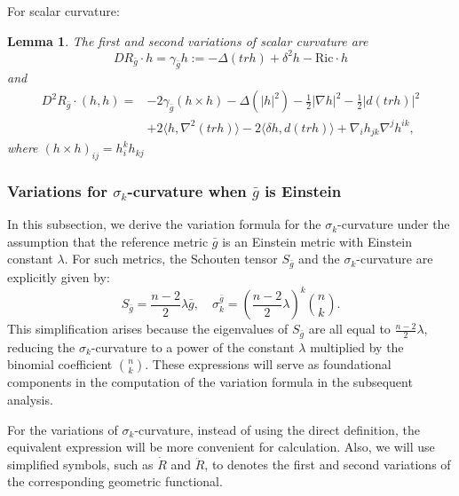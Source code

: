 \documentclass[12pt]{amsart}
\newtheorem{lemma}{Lemma}[section]
\newcommand{\bg}{\bar{g}}
\numberwithin{equation}{section}
\begin{document}
For scalar curvature:
\begin{lemma}\label{Lemma: variation_of_scalar}
    The first and second variations of scalar curvature are
    \begin{equation*}
        DR_{\bg}\cdot h=\gamma_{\bg} h:=-\Delta(trh)+\delta^2h-\mathrm{Ric}\cdot h
    \end{equation*}
    and
    \begin{equation*}
       \begin{split}
        D^2R_{\bg}\cdot(h,h)=&-2\gamma_{\bg}(h\times h)-\Delta(|h|^2)-\frac{1}{2}|\nabla h|^2-\frac{1}{2}|d(trh)|^2\\
        &+2\langle h,\nabla^2(trh)\rangle-2\langle\delta h,d(trh)\rangle+\nabla_{i}h_{jk}\nabla^jh^{ik},
       \end{split}
    \end{equation*}
    where $(h\times h)_{ij}=h_i^kh_{kj}$
\end{lemma}

\subsubsection{Variations for $\sigma_k$-curvature when $\bg$ is Einstein}

In this subsection, we derive the variation formula for the $\sigma_k$-curvature under the assumption that the reference metric $\bg$ is an Einstein metric with Einstein constant $\lambda$. For such metrics, the Schouten tensor $S_{\bg}$ and the $\sigma_k$-curvature are explicitly given by:
\begin{equation*}
    S_{\bg} = \frac{n - 2}{2} \lambda \bg, \quad \sigma_k^{\bg} = \left( \frac{n - 2}{2} \lambda \right)^k \binom{n}{k}.
\end{equation*}
This simplification arises because the eigenvalues of $S_{\bg}$ are all equal to $\frac{n-2}{2} \lambda$, reducing the $\sigma_k$-curvature to a power of the constant $\lambda$ multiplied by the binomial coefficient $\binom{n}{k}$. These expressions will serve as foundational components in the computation of the variation formula in the subsequent analysis.

For the variations of $\sigma_k$-curvature, instead of using the direct definition, the equivalent expression  will be more convenient for calculation. Also, we will use simplified symbols, such as $\dot{R}$ and $\ddot{R}$, to denotes the first and second variations of the corresponding geometric functional. 
\end{document}
